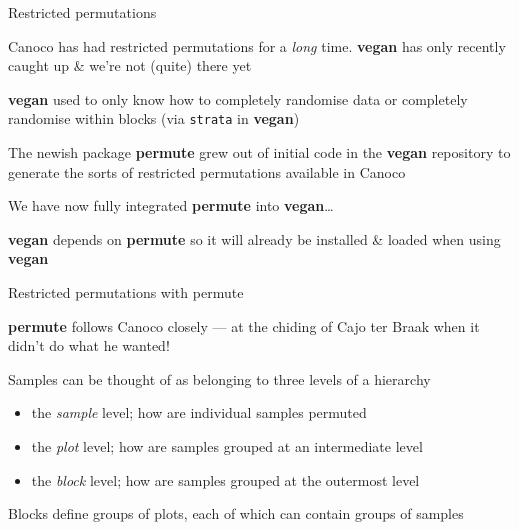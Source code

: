 \documentclass[10pt,ignorenonframetext,compress, aspectratio=169]{beamer}
\providecommand{\tightlist}{%
  \setlength{\itemsep}{0pt}\setlength{\parskip}{0pt}}
\begin{document}
\begin{frame}[fragile]{Restricted permutations}

Canoco has had restricted permutations for a \emph{long} time.
\textbf{vegan} has only recently caught up \& we're not (quite) there
yet

\textbf{vegan} used to only know how to completely randomise data or
completely randomise within blocks (via \texttt{strata} in
\textbf{vegan})

The newish package \textbf{permute} grew out of initial code in the
\textbf{vegan} repository to generate the sorts of restricted
permutations available in Canoco

We have now fully integrated \textbf{permute} into
\textbf{vegan}\ldots{}

\textbf{vegan} depends on \textbf{permute} so it will already be
installed \& loaded when using \textbf{vegan}

\end{frame}

\begin{frame}{Restricted permutations with permute}

\textbf{permute} follows Canoco closely --- at the chiding of Cajo ter
Braak when it didn't do what he wanted!

Samples can be thought of as belonging to three levels of a hierarchy

\begin{itemize}
\tightlist
\item
  the \emph{sample} level; how are individual samples permuted
\item
  the \emph{plot} level; how are samples grouped at an intermediate
  level
\item
  the \emph{block} level; how are samples grouped at the outermost level
\end{itemize}

Blocks define groups of plots, each of which can contain groups of
samples

\end{frame}
\end{document}
